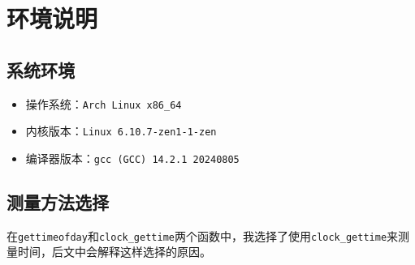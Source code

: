 \section{环境说明}

\subsection{系统环境}

\begin{itemize}
    \item 操作系统：{\tt Arch Linux x86_64}
    \item 内核版本：{\tt Linux 6.10.7-zen1-1-zen}
    \item 编译器版本：{\tt gcc (GCC) 14.2.1 20240805}
\end{itemize}

\subsection{测量方法选择}

在{\tt gettimeofday}和{\tt clock\_gettime}两个函数中，我选择了使用{\tt clock\_gettime}来测量时间，后文中会解释这样选择的原因。
